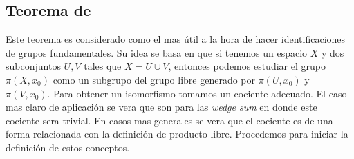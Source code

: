 \subsection{Teorema de \vank} \label{sec:vank}
Este teorema es considerado como el mas útil a la hora de hacer
identificaciones de grupos fundamentales. Su idea se basa en que si
tenemos un espacio \(X\) y dos subconjuntos \(U,V\) tales que \(X = U
\cup V\), entonces podemos estudiar el grupo \(\pi (X, x_0)\) como un
subgrupo del grupo libre generado por \(\pi (U, x_0)\) y \(\pi (V,
x_0)\). Para obtener un isomorfismo tomamos un cociente adecuado. El
caso mas claro de aplicación se vera que son para las \emph{wedge sum}
en donde este cociente sera trivial. En casos mas generales se vera que
el cociente es de una forma relacionada con la definición de producto
libre. Procedemos para iniciar la definición de estos conceptos.

